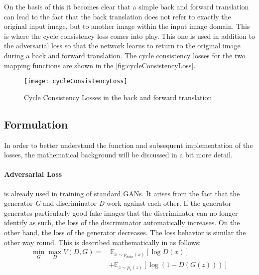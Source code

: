 \documentclass[fleqn,10pt]{SelfArx} %
\begin{document}
On the basis of this it becomes clear that a simple back and forward translation can lead to the fact that the back translation does not refer to exactly the original input image, but to another image within the input image domain. This is where the cycle consistency loss comes into play. This one is used in addition to the adversarial loss so that the network learns to return to the original image during a back and forward translation. The cycle consistency losses for the two mapping functions are shown in the \autoref{fig:cycleConsistencyLoss}.~\cite{image-to-image-ccan}

\begin{figure*}[htb] \centering 
	\texttt{[image: cycleConsistencyLoss]}
	\caption{Cycle Consistency Losses in the back and forward translation~\cite{image-to-image-ccan}}
	\label{fig:cycleConsistencyLoss}
\end{figure*}


\subsection{Formulation}
In order to better understand the function and subsequent implementation of the losses, the mathematical background will be discussed in a bit more detail.

\paragraph{Adversarial Loss} is already used in training of standard \ac{GAN}s. It arises from the fact that the generator \textit{G} and discriminator \textit{D} work against each other. If the generator generates particularly good fake images that the discriminator can no longer identify as such, the loss of the discriminator automatically increases. On the other hand, the loss of the generator decreases. The loss behavior is similar the other way round. This is described mathematically in \cite{Source-GAN} as follows:
\begin{equation*}
\begin{split}
\min_{G} \max_{D} V(D,G) =&~\mathbb E_{x \sim p_{data}(x)} [\log D(x)] \\\
&+ \mathbb E_{z \sim p_{z}(z)} [\log (1-D(G(z)))]
\end{split}
\end{equation*}
\end{document}
